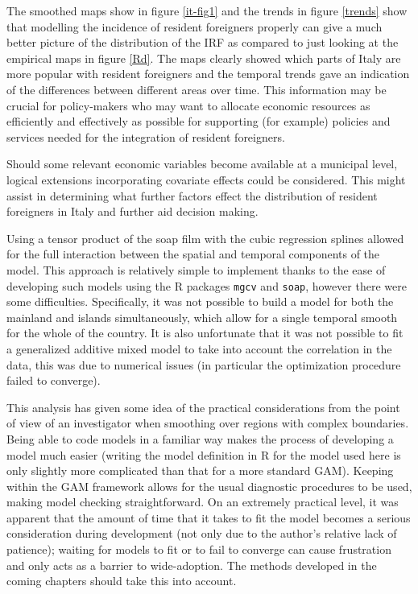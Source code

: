 The smoothed maps show in figure \ref{it-fig1} and the trends in figure \ref{trends} show that modelling the incidence of resident foreigners properly can give a much better picture of the distribution of the IRF as compared to just looking at the empirical maps in figure \ref{Rd}. The maps clearly showed which parts of Italy are more popular with resident foreigners and the temporal trends gave an indication of the differences between different areas over time. This information may be crucial for policy-makers who may want to allocate economic resources as efficiently and effectively as possible for supporting (for example) policies and services needed for the integration of resident foreigners.

Should some relevant economic variables become available at a municipal level, logical extensions incorporating covariate effects could be considered. This might assist in determining what further factors effect the distribution of resident foreigners in Italy and further aid decision making.

Using a tensor product of the soap film with the cubic regression splines allowed for the full interaction between the spatial and temporal components of the model. This approach is relatively simple to implement thanks to the ease of developing such models using the \textsf{R} packages \texttt{mgcv} and \texttt{soap}, however there were some difficulties. Specifically, it was not possible to build a model for both the mainland and islands simultaneously, which allow for a single temporal smooth for the whole of the country. It is also unfortunate that it was not possible to fit a generalized additive mixed model to take into account the correlation in the data, this was due to numerical issues (in particular the optimization procedure failed to converge).

This analysis has given some idea of the practical considerations from the point of view of an investigator when smoothing over regions with complex boundaries. Being able to code models in a familiar way makes the process of developing a model much easier (writing the model definition in \textsf{R} for the model used here is only slightly more complicated than that for a more standard GAM). Keeping within the GAM framework allows for the usual diagnostic procedures to be used, making model checking straightforward. On an extremely practical level, it was apparent that the amount of time that it takes to fit the model becomes a serious consideration during development (not only due to the author's relative lack of patience); waiting for models to fit or to fail to converge can cause frustration and only acts as a barrier to wide-adoption. The methods developed in the coming chapters should take this into account.


